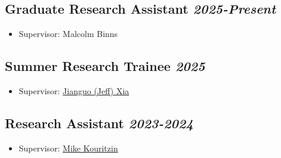 \vspace*{10pt}
\subsection{Graduate Research Assistant
  \hfill {\normalfont\itshape 2025-Present}}
\begin{itemize}[topsep=2pt, partopsep=0pt, parsep=0pt, itemsep=0pt]
    \item Supervisor: Malcolm Binns
\end{itemize}

\vspace*{6pt}
\subsection{Summer Research Trainee
  \hfill {\normalfont\itshape 2025}}
\begin{itemize}[topsep=2pt, partopsep=0pt, parsep=0pt, itemsep=0pt]
    \item Supervisor: \href{https://www.xialab.ca/}{Jianguo (Jeff) Xia}
\end{itemize}

\vspace*{6pt}
\subsection{Research Assistant
  \hfill {\normalfont\itshape 2023-2024}}
\begin{itemize}[topsep=2pt, partopsep=0pt, parsep=0pt, itemsep=0pt]
    \item Supervisor: \href{https://www.math.ualberta.ca/~mkouritz/Kouritzin_M.html}{Mike Kouritzin}
\end{itemize}